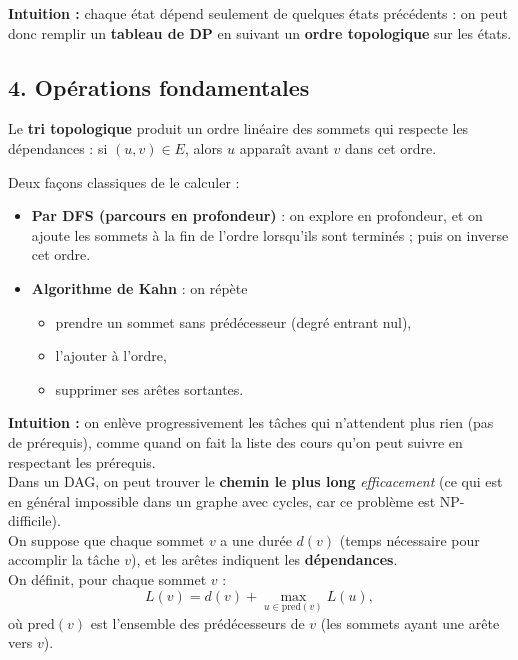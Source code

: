 \textbf{Intuition :} chaque état dépend seulement de quelques états précédents : on peut donc remplir un \textbf{tableau de DP} en suivant un \textbf{ordre topologique} sur les états.

\subsection*{4. Opérations fondamentales}

Le \textbf{tri topologique} produit un ordre linéaire des sommets qui respecte les dépendances :
si $(u,v) \in E$, alors $u$ apparaît avant $v$ dans cet ordre.

Deux façons classiques de le calculer :
\begin{itemize}
    \item \textbf{Par DFS (parcours en profondeur)} : on explore en profondeur, et on ajoute les sommets à la fin de l’ordre lorsqu’ils sont \og terminés\fg{} ; puis on inverse cet ordre.
    \item \textbf{Algorithme de Kahn} : on répète
    \begin{itemize}
        \item prendre un sommet sans prédécesseur (degré entrant nul),
        \item l’ajouter à l’ordre,
        \item supprimer ses arêtes sortantes.
    \end{itemize}
\end{itemize}

\textbf{Intuition :} on enlève progressivement les tâches qui n’attendent plus rien (pas de prérequis), comme quand on fait la liste des cours qu’on peut suivre en respectant les prérequis. \\

Dans un DAG, on peut trouver le \textbf{chemin le plus long} \emph{efficacement} (ce qui est en général impossible dans un graphe avec cycles, car ce problème est NP-difficile). \\

On suppose que chaque sommet $v$ a une durée $d(v)$ (temps nécessaire pour accomplir la tâche $v$), et les arêtes indiquent les \textbf{dépendances}. \\

On définit, pour chaque sommet $v$ :
\[
L(v) = d(v) + \max_{u \in \text{pred}(v)} L(u),
\]
où $\text{pred}(v)$ est l’ensemble des prédécesseurs de $v$ (les sommets ayant une arête vers $v$). \\

